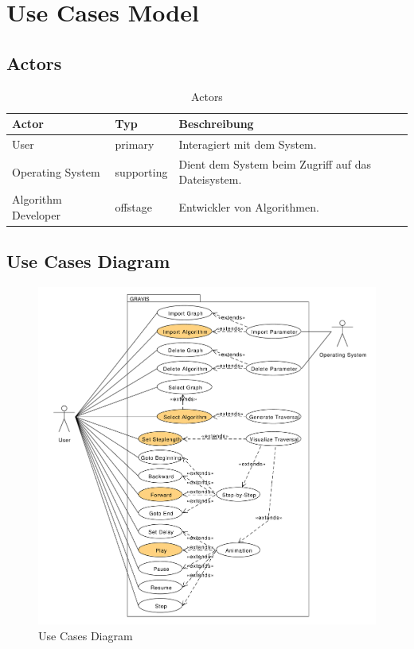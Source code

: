 \section{Use Cases Model}
\label{sec:Use Cases Model}
% 
\subsection{Actors}
\label{subsec:Actors}
\begin{table}[htp]
  \begin{tabular}[t]{|l|l|l|}\hline
	  \rowcolor{tcA}
	  Actor 		& Typ 		& Beschreibung \\\hline
	  User		 	& primary 	& Interagiert mit dem System. \\\hline
	  Operating System 	& supporting 	& Dient dem System beim Zugriff auf das Dateisystem. \\\hline
	  Algorithm Developer 	& offstage 	& Entwickler von Algorithmen. \\\hline
  \end{tabular}
  \caption{Actors}
  \label{tab:actors}
\end{table}

% 
\subsection{Use Cases Diagram}
\label{subsec:Use Cases Diagram}
\begin{figure}[H]
    \centering
    \includegraphics[scale=0.5]{diagrams/use-cases-diagram.pdf}
    \caption{Use Cases Diagram}
    \label{fig:use_cases_diagram}
\end{figure}
% 
